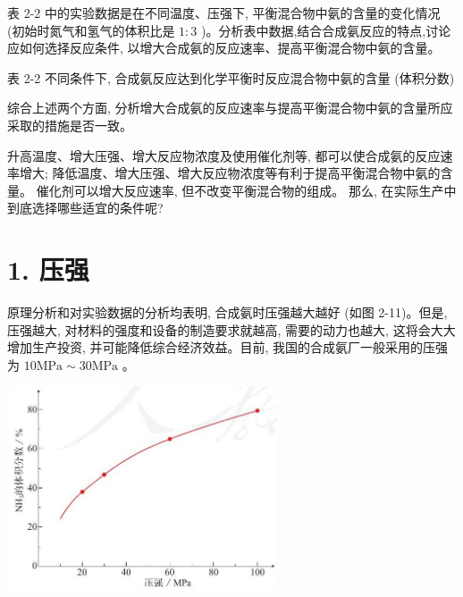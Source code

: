\documentclass[10pt]{article}
\begin{document}
表 2-2 中的实验数据是在不同温度、压强下, 平衡混合物中氨的含量的变化情况 (初始时氮气和氢气的体积比是 \(1 : 3\) )。分析表中数据,结合合成氨反应的特点,讨论应如何选择反应条件, 以增大合成氨的反应速率、提高平衡混合物中氨的含量。

表 2-2 不同条件下, 合成氨反应达到化学平衡时反应混合物中氨的含量 (体积分数)

\begin{center}
\end{center}

综合上述两个方面, 分析增大合成氨的反应速率与提高平衡混合物中氨的含量所应采取的措施是否一致。

升高温度、增大压强、增大反应物浓度及使用催化剂等, 都可以使合成氨的反应速率增大; 降低温度、增大压强、增大反应物浓度等有利于提高平衡混合物中氨的含量。 催化剂可以增大反应速率, 但不改变平衡混合物的组成。 那么, 在实际生产中到底选择哪些适宜的条件呢?

\section*{1. 压强}

原理分析和对实验数据的分析均表明, 合成氨时压强越大越好 (如图 2-11)。但是, 压强越大, 对材料的强度和设备的制造要求就越高, 需要的动力也越大, 这将会大大增加生产投资, 并可能降低综合经济效益。目前, 我国的合成氨厂一般采用的压强为 \({10}\mathrm{{MPa}} \sim {30}\mathrm{{MPa}}\) 。

\begin{center}
\includegraphics[max width=0.6\textwidth]{images/0190da9d-8bfd-732f-bc2c-0b21d0f13b91_52_832648.jpg}
\end{center}
\end{document}

